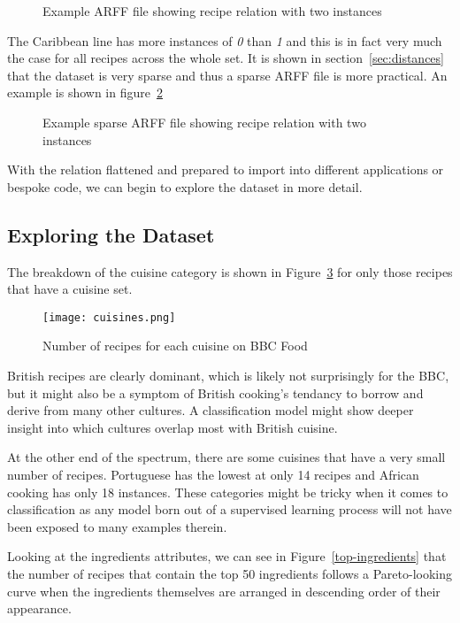 \documentclass[11pt,a4paper]{article}
\begin{document}
\begin{figure}[h]
  
  \caption{Example ARFF file showing recipe relation with two instances}
  \label{fig:arff}
\end{figure}

The Caribbean line has more instances of \emph{0} than \emph{1} and this is in
fact very much the case for all recipes across the whole set. It is shown in
section~\ref{sec:distances} that the dataset is very sparse and thus a
sparse ARFF file is more practical. \cite{witten2011data} An example is shown
in figure~\ref{fig:arff-sparse}

\begin{figure}[h]
  
  \caption{Example sparse ARFF file showing recipe relation with two instances}
  \label{fig:arff-sparse}
\end{figure}

With the relation flattened and prepared to import into different applications
or bespoke code, we can begin to explore the dataset in more detail.

\subsection{Exploring the Dataset}
\label{sec:exploring}

The breakdown of the cuisine category is shown in Figure~\ref{cuisines-barchart}
for only those recipes that have a cuisine set.

\begin{figure}[p]
  \texttt{[image: cuisines.png]}
  \caption{Number of recipes for each cuisine on BBC Food\label{cuisines-barchart}}
\end{figure}

British recipes are clearly dominant, which is likely not surprisingly for the
BBC, but it might also be a symptom of British cooking's tendancy to borrow and
derive from
many other cultures. A classification model might show deeper insight into which
cultures overlap most with British cuisine.

At the other end of the spectrum, there are some cuisines that have a very small
number of recipes. Portuguese has the lowest at only 14 recipes and African
cooking has only 18 instances. These categories might be tricky when it comes to
classification as any model born out of a supervised learning process will not
have been exposed to many examples therein.

Looking at the ingredients attributes, we can see in Figure~\ref{top-ingredients}
that the number of recipes that contain the top 50 ingredients follows a
Pareto-looking curve when the ingredients themselves are arranged in descending
order of their appearance.
\end{document}
